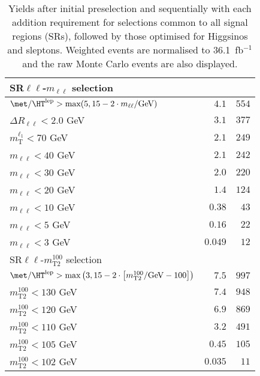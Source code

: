 \begin{table}
\begin{center}
\begin{tabular*}{\textwidth}{@{\extracolsep{\fill}}lrr}
\midrule
SR$\ell\ell$-$m_{\ell\ell}$ selection & \\ 
\midrule
$\met / \HT^\text{lep} > \text{max}(5, 15-2\cdot m_{\ell\ell}/\text{GeV})$ & $4.1$ & $554$   \\ 
    $\Delta R_{\ell\ell} < 2.0$ GeV & $3.1$ & $377$   \\ 
    $m_\text{T}^{\ell_1} < 70$ GeV & $2.1$ & $249$   \\ 
    $m_{\ell\ell} < 40$ GeV & $2.1$ & $242$   \\ 
    $m_{\ell\ell} < 30$ GeV & $2.0$ & $220$   \\ 
    $m_{\ell\ell} < 20$ GeV & $1.4$ & $124$   \\ 
    $m_{\ell\ell} < 10$ GeV & $0.38$ & $43$   \\ 
    $m_{\ell\ell} < 5$ GeV & $0.16$ & $22$   \\ 
    $m_{\ell\ell} < 3$ GeV & $0.049$ & $12$   \\ 
    \midrule
SR$\ell\ell$-$m_\text{T2}^{100}$ selection & \\ 
\midrule
$\met / \HT^\text{lep} > \text{max}\left(3, 15-2\cdot \left[m_\text{T2}^{100}/\text{GeV} - 100\right]\right)$ & $7.5$ & $997$   \\ 
    $m_\text{T2}^{100} < 130$ GeV & $7.4$ & $948$   \\ 
    $m_\text{T2}^{100} < 120$ GeV & $6.9$ & $869$   \\ 
    $m_\text{T2}^{100} < 110$ GeV & $3.2$ & $491$   \\ 
    $m_\text{T2}^{100} < 105$ GeV & $0.45$ & $105$   \\ 
    $m_\text{T2}^{100} < 102$ GeV & $0.035$ & $11$   \\ 
    
  \bottomrule
  \end{tabular*}
\end{center}
\caption{ Yields after initial preselection and sequentially with each addition requirement 
for selections common to all signal regions (SRs), 
followed by those optimised for Higgsinos and sleptons. 
Weighted events are normalised to 36.1~fb$^{-1}$ and the raw Monte Carlo events are also displayed.
}
\label{tab:cutflow_other}
\end{table} 
  
